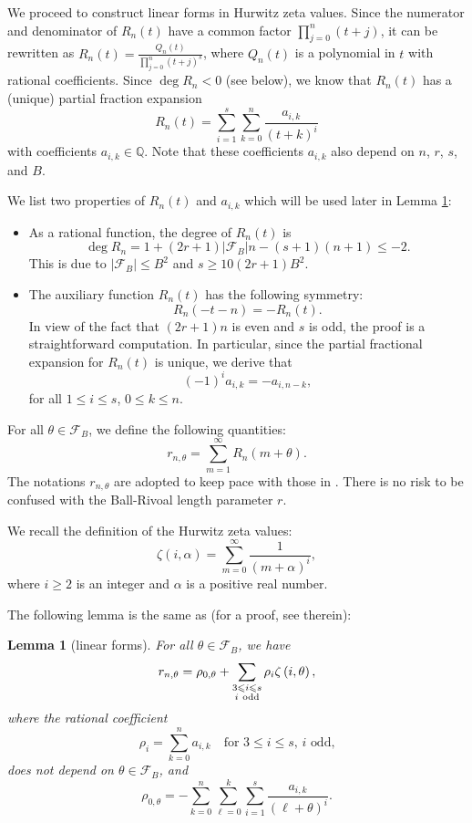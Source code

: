 \documentclass[11pt]{amsart}
\newtheorem{lemma}[theorem]{Lemma}
\numberwithin{equation}{section}
\begin{document}
We proceed to construct linear forms in Hurwitz zeta values. Since the numerator and denominator of $R_{n}(t)$ have a common factor $\prod_{j=0}^{n} (t+j)$, it can be rewritten as $R_{n}(t) = \frac{Q_{n}(t)}{\prod_{j=0}^{n} (t+j)^{s}}$, where $Q_{n}(t)$ is a polynomial in $t$ with rational coefficients. Since $\deg R_n <0$ (see below), we know that $R_n(t)$ has a (unique) partial fraction expansion
\begin{equation}\label{a_ik}
R_n(t) = \sum_{i=1}^{s}\sum_{k=0}^{n} \frac{a_{i,k}}{(t+k)^i}
\end{equation}
with coefficients $a_{i,k} \in \mathbb{Q}$. Note that these coefficients $a_{i,k}$ also depend on $n$, $r$, $s$, and $B$.

We list two properties of $R_n(t)$ and $a_{i,k}$ which will be used later in Lemma \ref{LemmaLin}:
\begin{itemize}
\item[(1)] As a rational function, the degree of $R_{n}(t)$ is
\[ \deg R_n = 1 + (2r+1)|\mathcal{F}_B|n - (s+1)(n+1)  \leqslant -2.\]
This is due to $|\mathcal{F}_B| \leqslant B^2$ and $s \geqslant 10(2r+1)B^2$.
\item[(2)] The auxiliary function $R_{n}(t)$ has the following symmetry:
\[R_{n}(-t-n) = - R_{n}(t).\]
In view of the fact that $(2r+1)n$ is even and $s$ is odd, the proof is a straightforward computation. In particular, since the partial fractional expansion for $R_n(t)$ is unique, we derive that
\[(-1)^i a_{i,k} =- a_{i,n-k},\]
for all $1\leqslant i\leqslant s$, $0 \leqslant k \leqslant n$.
\end{itemize}

For all $\theta \in \mathcal{F}_B$, we define the following quantities:
\begin{equation}\label{r_n_theta}
r_{n,\theta} = \sum_{m=1}^{\infty} R_{n}(m+\theta).
\end{equation}
The notations $r_{n,\theta}$ are adopted to keep pace with those in \cite{FSZ2019}. There is no risk to be confused with the Ball-Rivoal length parameter $r$.

We recall the definition of the Hurwitz zeta values:
\[\zeta(i,\alpha)  = \sum_{m=0}^{\infty} \frac{1}{(m+\alpha)^i},\]
where $i\geqslant 2$ is an integer and $\alpha$ is a positive real number.

The following lemma is the same as \cite[Lemma 1]{FSZ2019} (for a proof, see therein):

\smallskip
\begin{lemma}[linear forms]\label{LemmaLin} For all $\theta \in \mathcal{F}_B$, we have
\[r_{n,\theta} = \rho_{0,\theta} + \sum_{\substack{3 \leqslant i \leqslant s \\ i ~ {\rm odd}}} \rho_{i} \zeta\left(i,\theta \right),\]
where the rational coefficient
\[\rho_{i} = \sum_{k=0}^{n} a_{i,k} \quad \text{for $3 \leqslant i \leqslant s$, $i$ odd,}\]
does not depend on $\theta \in \mathcal{F}_B$, and
\[\rho_{0,\theta} = - \sum_{k=0}^{n}\sum_{\ell=0}^{k}\sum_{i=1}^{s} \frac{a_{i,k}}{\left( \ell+\theta \right)^i}.\]
\end{lemma}
\bigskip
\end{document}
